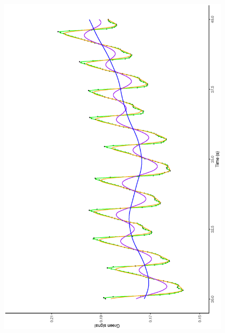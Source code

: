 \documentclass[twocolumn]{bmcart}%
\begin{document}
\begin{figure}[p]
\begin{center}
{{           		  	  \includegraphics[width =\linewidth,angle=270]{pes1d2}
        	                 }
        			\subfigure[]{
         		            \label{fig:pues1d2}
}}
\end{center}
\end{figure}
\end{document}
